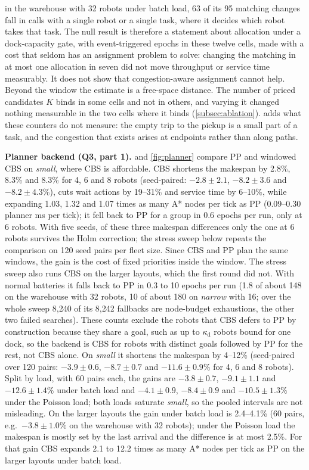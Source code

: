 in the warehouse with 32 robots under batch load, 63 of its 95 matching
changes fall in calls with a single robot or a single task, where it decides
which robot takes that task. The null result is therefore a statement about
allocation under a dock-capacity gate, with event-triggered epochs in these twelve
cells, made with a cost that seldom has an assignment problem to solve: changing the matching in at
most one allocation in seven did not move throughput or service time
measurably. It does not show that congestion-aware assignment cannot help.
Beyond the window the estimate is a free-space distance. The number of priced
candidates $K$ binds in some cells and not in others, and varying it
changed nothing measurable in the two cells where it binds (\cref{subsec:ablation}).
 adds what these counters do not measure: the empty trip to
the pickup is a small part of a task, and the congestion that exists arises
at endpoints rather than along paths.

\noindent\textbf{Planner backend (Q3, part 1).}
 and \cref{fig:planner} compare PP and windowed CBS on
\emph{small}, where CBS is affordable. CBS shortens the makespan by 2.8\%,
8.3\% and 8.3\% for 4, 6 and 8 robots (seed-paired: $-2.8\pm2.1$,
$-8.2\pm3.6$ and $-8.2\pm4.3\%$), cuts wait actions by 19--31\% and
service time by 6--10\%, while expanding 1.03, 1.32 and 1.07 times as many
A* nodes per tick as PP (0.09--0.30 planner ms per tick); it fell back
to PP for a group in 0.6 epochs per run, only at 6 robots. With five seeds,
of these three makespan differences only the one at 6 robots survives the
Holm correction; the stress sweep below repeats the comparison on 120 seed
pairs per fleet size. Since CBS and PP plan the same windows, the
gain is the cost of fixed priorities inside the window. The stress sweep also runs CBS on the larger layouts,
which the first round did not. With normal batteries it falls back to PP in
0.3 to 10 epochs per run (1.8 of about 148 on the warehouse with 32 robots,
10 of about 180 on \emph{narrow} with 16; over the whole sweep 8{,}240 of
its 8{,}242 fallbacks are node-budget exhaustions, the other two failed
searches). These counts exclude the robots that CBS defers to PP by
construction because they share a goal, such as up to
$\kappa_{\mathrm{d}}$ robots bound for one dock, so the backend is CBS for
robots with distinct goals followed by PP for the rest, not CBS alone. On
\emph{small} it shortens the makespan by 4--12\% (seed-paired over 120
pairs: $-3.9\pm0.6$, $-8.7\pm0.7$ and $-11.6\pm0.9\%$ for 4, 6 and 8
robots). Split by load, with 60 pairs each, the gains are $-3.8\pm0.7$,
$-9.1\pm1.1$ and $-12.6\pm1.4\%$ under batch load and $-4.1\pm0.9$,
$-8.4\pm0.9$ and $-10.5\pm1.3\%$ under the Poisson load; both loads saturate
\emph{small}, so the pooled intervals are not misleading. On the larger layouts the gain under batch load is 2.4--4.1\%
(60 pairs, e.g.\ $-3.8\pm1.0\%$ on the warehouse with 32 robots); under the
Poisson load the makespan is mostly set by the last arrival and the
difference is at most 2.5\%. For that gain CBS expands 2.1 to 12.2 times as
many A* nodes per tick as PP on the larger layouts under batch load.



